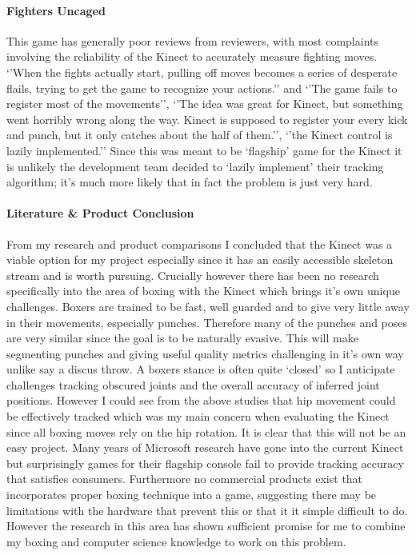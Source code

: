 \paragraph{Fighters Uncaged}
This game has generally poor reviews from reviewers, with most complaints involving the reliability of the Kinect to accurately measure fighting moves. \cite{gamerev1} `'When the fights actually start, pulling off moves becomes a series of desperate flails, trying to get the game to recognize your actions.''\cite{gamerev2} 
and `'The game fails to register most of the movements'', `'The idea was great for Kinect, but something went horribly wrong along the way. Kinect is supposed to register your every kick and punch, but it only catches about the half of them.'', `'the Kinect control is lazily implemented.''\cite{gamerev3} \newline
Since this was meant to be `flagship' game for the Kinect it is unlikely the development team decided to `lazily implement' their tracking algorithm; it's much more likely that in fact the problem is just very hard.

\paragraph{Literature \& Product Conclusion}
From my research and product comparisons I concluded that the Kinect was a viable option for my project especially since it has an easily accessible skeleton stream and is worth pursuing. Crucially however there has been no research specifically into the area of boxing with the Kinect which brings it's own unique challenges. Boxers are trained to be fast, well guarded and to give very little away in their movements, especially punches. Therefore many of the punches and poses are very similar since the goal is to be naturally evasive. This will make segmenting punches and giving useful quality metrics challenging in it's own way unlike say a discus throw. A boxers stance is often quite `closed' so I anticipate challenges tracking obscured joints and the overall accuracy of inferred joint positions. However I could see from the above studies that hip movement could be effectively tracked which was my main concern when evaluating the Kinect since all boxing moves rely on the hip rotation.
\newline\newline 
It is clear that this will not be an easy project. Many years of Microsoft research have gone into the current Kinect but surprisingly games for their flagship console fail to provide tracking accuracy that satisfies consumers. Furthermore no commercial products exist that incorporates proper boxing technique into a game, suggesting there may be limitations with the hardware that prevent this or that it it simple difficult to do. However the research in this area has shown sufficient promise for me to combine my boxing and computer science knowledge to work on this problem.\clearpage

